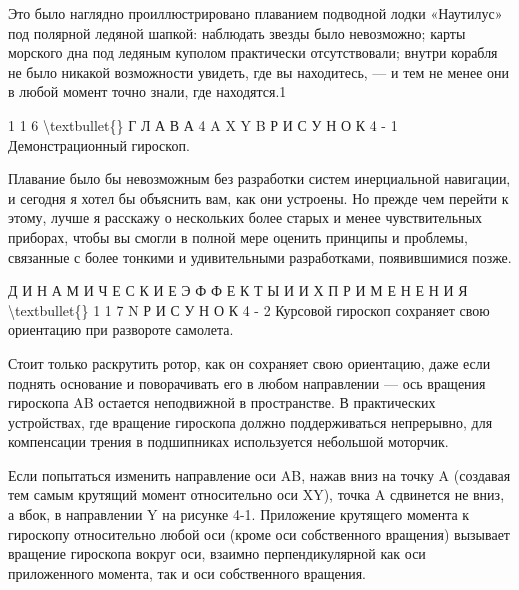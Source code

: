 \documentclass[10pt,oneside]{article}
\newcommand{\TipsSubsection}[1]{\par\vspace{6bp}{\normalsize\bfseries #1\par}\vspace{2bp}}
\begin{document}
Это было наглядно проиллюстрировано плаванием подводной лодки «Наутилус» под полярной ледяной шапкой: наблюдать звезды было невозможно; карты морского дна под ледяным куполом практически отсутствовали; внутри корабля не было никакой возможности увидеть, где вы находитесь, --- и тем не менее они в любой момент точно знали, где находятся.1\par

1 1 6 \textbackslash{}textbullet\{\} Г Л А В А  4 A X Y B Р И С У Н О К  4 - 1 Демонстрационный гироскоп.\par

Плавание было бы невозможным без разработки систем инерциальной навигации, и сегодня я хотел бы объяснить вам, как они устроены. Но прежде чем перейти к этому, лучше я расскажу о нескольких более старых и менее чувствительных приборах, чтобы вы смогли в полной мере оценить принципы и проблемы, связанные с более тонкими и удивительными разработками, появившимися позже.\par

\TipsSubsection{4-1 Демонстрационный гироскоп Если вы никогда не видели подобных вещей, на рисунке 4-1 показан демонстрационный гироскоп в карданном подвесе. 1В 1958 году атомная подводная лодка USS Nautilus, первая в мире атомная подводная лодка, совершила переход из Гавайев в Англию, пройдя Северный полюс 3 августа. Под полярной ледяной шапкой она находилась в общей сложности 95 часов.}

Д И Н А М И Ч Е С К И Е  Э Ф Ф Е К Т Ы  И  И Х  П Р И М Е Н Е Н И Я \textbackslash{}textbullet\{\} 1 1 7 N Р И С У Н О К  4 - 2 Курсовой гироскоп сохраняет свою ориентацию при развороте самолета.\par

Стоит только раскрутить ротор, как он сохраняет свою ориентацию, даже если поднять основание и поворачивать его в любом направлении --- ось вращения гироскопа AB остается неподвижной в пространстве. В практических устройствах, где вращение гироскопа должно поддерживаться непрерывно, для компенсации трения в подшипниках используется небольшой моторчик.\par

Если попытаться изменить направление оси AB, нажав вниз на точку A (создавая тем самым крутящий момент относительно оси XY), точка A сдвинется не вниз, а вбок, в направлении Y на рисунке 4-1. Приложение крутящего момента к гироскопу относительно любой оси (кроме оси собственного вращения) вызывает вращение гироскопа вокруг оси, взаимно перпендикулярной как оси приложенного момента, так и оси собственного вращения.\par
\end{document}
